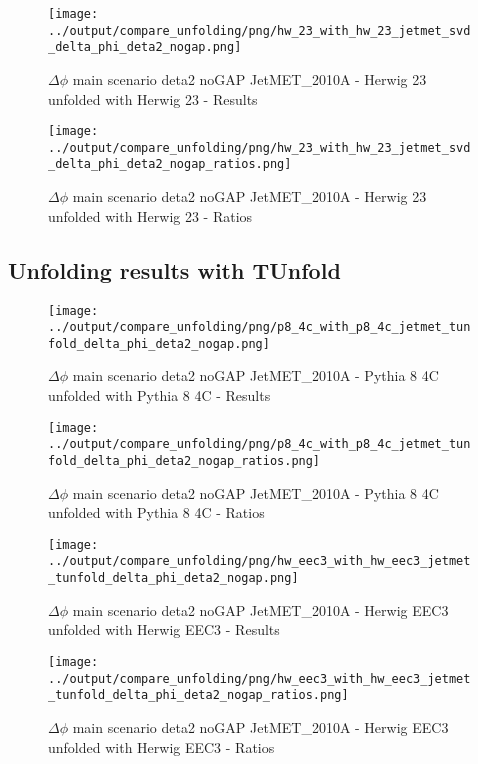 \documentclass[11pt]{book}
\begin{document}
\begin{figure}[ht]
\centering
\texttt{[image: ../output/compare\_unfolding/png/hw\_23\_with\_hw\_23\_jetmet\_svd\_delta\_phi\_deta2\_nogap.png]}
\caption{$\Delta\phi$ main scenario deta2 noGAP JetMET\_2010A - Herwig 23 unfolded with Herwig 23 - Results}
\label{hw_23_hw_23_jetmet_svd_delta_phi_deta2_nogap_a}
\end{figure}

\begin{figure}[ht]
\centering
\texttt{[image: ../output/compare\_unfolding/png/hw\_23\_with\_hw\_23\_jetmet\_svd\_delta\_phi\_deta2\_nogap\_ratios.png]}
\caption{$\Delta\phi$ main scenario deta2 noGAP JetMET\_2010A - Herwig 23 unfolded with Herwig 23 - Ratios}
\label{hw_23_hw_23_jetmet_svd_delta_phi_deta2_nogap_b}
\end{figure}


\clearpage
\subsection{Unfolding results with TUnfold}

\begin{figure}[ht]
\centering
\texttt{[image: ../output/compare\_unfolding/png/p8\_4c\_with\_p8\_4c\_jetmet\_tunfold\_delta\_phi\_deta2\_nogap.png]}
\caption{$\Delta\phi$ main scenario deta2 noGAP JetMET\_2010A - Pythia 8 4C unfolded with Pythia 8 4C - Results}
\label{p8_p8_jetmet_tunfold_delta_phi_deta2_nogap_a}
\end{figure}

\begin{figure}[ht]
\centering
\texttt{[image: ../output/compare\_unfolding/png/p8\_4c\_with\_p8\_4c\_jetmet\_tunfold\_delta\_phi\_deta2\_nogap\_ratios.png]}
\caption{$\Delta\phi$ main scenario deta2 noGAP JetMET\_2010A - Pythia 8 4C unfolded with Pythia 8 4C - Ratios}
\label{p8_p8_jetmet_tunfold_delta_phi_deta2_nogap_b}
\end{figure}

\begin{figure}[ht]
\centering
\texttt{[image: ../output/compare\_unfolding/png/hw\_eec3\_with\_hw\_eec3\_jetmet\_tunfold\_delta\_phi\_deta2\_nogap.png]}
\caption{$\Delta\phi$ main scenario deta2 noGAP JetMET\_2010A - Herwig EEC3 unfolded with Herwig EEC3 - Results}
\label{hw_eec3_hw_eec3_jetmet_tunfold_delta_phi_deta2_nogap_a}
\end{figure}

\begin{figure}[ht]
\centering
\texttt{[image: ../output/compare\_unfolding/png/hw\_eec3\_with\_hw\_eec3\_jetmet\_tunfold\_delta\_phi\_deta2\_nogap\_ratios.png]}
\caption{$\Delta\phi$ main scenario deta2 noGAP JetMET\_2010A - Herwig EEC3 unfolded with Herwig EEC3 - Ratios}
\label{hw_eec3_hw_eec3_jetmet_tunfold_delta_phi_deta2_nogap_b}
\end{figure}
\end{document}
